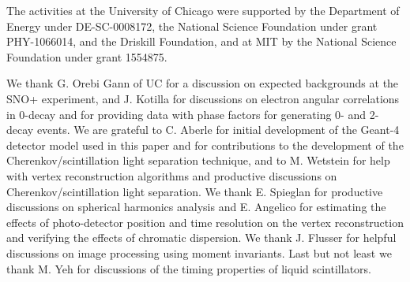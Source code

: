 The activities at the University of Chicago  were supported by the
Department of Energy under DE-SC-0008172, the
National Science Foundation under grant PHY-1066014, and the Driskill
Foundation, and at MIT by  the
National Science Foundation under grant 1554875.

We thank G. Orebi Gann of UC for a discussion on expected backgrounds
at the SNO+ experiment, and J.  Kotilla for discussions on electron
angular correlations in 0\nbb-decay and for providing data with phase
factors for generating 0\nbb- and 2\nbb-decay events.  We are grateful
to C. Aberle for initial development of the Geant-4
detector model used in this paper and for contributions to the
development of the Cherenkov/scintillation light separation technique, and
to M.  Wetstein for help with vertex reconstruction algorithms and
productive discussions on Cherenkov/scintillation light separation. We
thank E. Spieglan for productive discussions on spherical harmonics
analysis and E. Angelico for estimating the effects of photo-detector
position and time resolution on the vertex reconstruction and
verifying the effects of chromatic dispersion.  We thank J. Flusser
for helpful discussions on image processing using moment
invariants. Last but not least we thank M. Yeh for discussions of the
timing properties of liquid scintillators.
